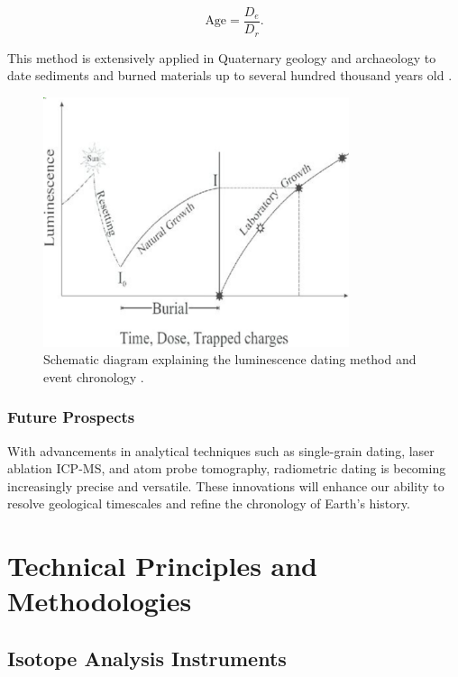 \documentclass{article}
\begin{document}
\begin{equation}
\text{Age} = \frac{D_e}{D_r}.
\end{equation}

This method is extensively applied in Quaternary geology and archaeology to date sediments and burned materials up to several hundred thousand years old \cite{Aitken1998OSL}.
\begin{figure}[htbp]
    \centering
    \includegraphics[width=0.8\textwidth]{luminescence_dating.png}
    \caption{Schematic diagram explaining the luminescence dating method and event chronology \cite{LuminescenceDatingDiagram}.}
    \label{fig:luminescence_dating}
\end{figure}

\subsubsection*{Future Prospects}  
With advancements in analytical techniques such as single-grain dating, laser ablation ICP-MS, and atom probe tomography, radiometric dating is becoming increasingly precise and versatile. These innovations will enhance our ability to resolve geological timescales and refine the chronology of Earth's history.

\section{Technical Principles and Methodologies}
\subsection{Isotope Analysis Instruments} \label{sec:isotope_analysis}
\end{document}
